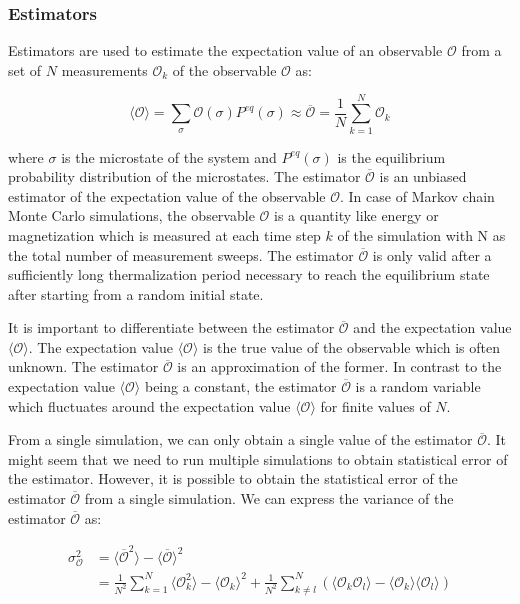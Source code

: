 \subsubsection{Estimators}

Estimators are used to estimate the expectation value of an observable
$\mathcal{O}$ from a set of $N$ measurements $\mathcal{O}_k$ of the observable
$\mathcal{O}$ as:

\begin{equation}
  \label{eq:estimator}
  \langle\mathcal{O}\rangle = \sum_{\sigma} \mathcal{O}(\sigma)P^{eq}(\sigma) \approx \overline{\mathcal{O}} =  \frac{1}{N}\sum_{k=1}^{N}\mathcal{O}_k
\end{equation}

where $\sigma$ is the microstate of the system and $P^{eq}(\sigma)$ is the
equilibrium probability distribution of the microstates. The estimator
$\overline{\mathcal{O}}$ is an unbiased estimator of the expectation value of
the observable $\mathcal{O}$. In case of Markov chain Monte Carlo simulations,
the observable $\mathcal{O}$ is a quantity like energy or magnetization which is
measured at each time step $k$ of the simulation with N as the total number of
measurement sweeps. The estimator $\overline{\mathcal{O}}$ is only valid after a
sufficiently long thermalization period necessary to reach the equilibrium state
after starting from a random initial state.

It is important to differentiate between the estimator $\overline{\mathcal{O}}$
and the expectation value $\langle\mathcal{O}\rangle$. The expectation value
$\langle\mathcal{O}\rangle$ is the true value of the observable which is often
unknown. The estimator $\overline{\mathcal{O}}$ is an approximation of the
former. In contrast to the expectation value $\langle\mathcal{O}\rangle$ being a
constant, the estimator $\overline{\mathcal{O}}$ is a random variable which
fluctuates around the expectation value $\langle\mathcal{O}\rangle$ for finite
values of $N$. 

From a single simulation, we can only obtain a single value of the estimator
$\overline{\mathcal{O}}$. It might seem that we need to run multiple simulations
to obtain statistical error of the estimator. However, it is possible to obtain
the statistical error of the estimator $\overline{\mathcal{O}}$ from a single
simulation. We can express the variance of the estimator
$\overline{\mathcal{O}}$ as:

\begin{align}
  \sigma^2_{\mathcal{O}} &= \langle\overline{\mathcal{O}}^2\rangle - \langle\overline{\mathcal{O}}\rangle^2 \\
  &= \frac{1}{N^2}\sum_{k=1}^{N}\langle\mathcal{O}_k^2\rangle - \langle\mathcal{O}_k\rangle^2 + \frac{1}{N^2}\sum_{k\neq l}^{N}(\langle\mathcal{O}_k\mathcal{O}_l\rangle- \langle\mathcal{O}_k\rangle\langle\mathcal{O}_l\rangle)
  \label{eq:variance_estimator}
\end{align}

